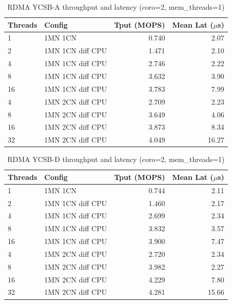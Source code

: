 \documentclass[conference]{IEEEtran}
\begin{document}
\begin{table}[H]
\centering
\caption{RDMA YCSB-A throughput and latency (coro=2, mem\_threads=1)}
\label{tab:rdma-ycsba}
\scriptsize
\begin{tabular}{@{}llrr@{}}
\toprule
\textbf{Threads} & \textbf{Config} & \textbf{Tput (MOPS)} & \textbf{Mean Lat ($\mu$s)} \\
\midrule
1  & 1MN 1CN             & 0.740 & 2.07 \\
2  & 1MN 1CN diff CPU    & 1.471 & 2.10 \\
4  & 1MN 1CN diff CPU    & 2.746 & 2.22 \\
8  & 1MN 1CN diff CPU    & 3.632 & 3.90 \\
16 & 1MN 1CN diff CPU    & 3.783 & 7.99 \\
\midrule
4  & 1MN 2CN diff CPU    & 2.709 & 2.23 \\
8  & 1MN 2CN diff CPU    & 3.649 & 4.06 \\
16 & 1MN 2CN diff CPU    & 3.873 & 8.34 \\
32 & 1MN 2CN diff CPU    & 4.049 & 16.27 \\
\bottomrule
\end{tabular}
\end{table}

\begin{table}[H]
\centering
\caption{RDMA YCSB-D throughput and latency (coro=2, mem\_threads=1)}
\label{tab:rdma-ycsbd}
\scriptsize
\begin{tabular}{@{}llrr@{}}
\toprule
\textbf{Threads} & \textbf{Config} & \textbf{Tput (MOPS)} & \textbf{Mean Lat ($\mu$s)} \\
\midrule
1  & 1MN 1CN             & 0.744 & 2.11 \\
2  & 1MN 1CN diff CPU    & 1.460 & 2.17 \\
4  & 1MN 1CN diff CPU    & 2.699 & 2.34 \\
8  & 1MN 1CN diff CPU    & 3.832 & 3.57 \\
16 & 1MN 1CN diff CPU    & 3.900 & 7.47 \\
\midrule
4  & 1MN 2CN diff CPU    & 2.720 & 2.34 \\
8  & 1MN 2CN diff CPU    & 3.982 & 2.27 \\
16 & 1MN 2CN diff CPU    & 4.229 & 7.80 \\
32 & 1MN 2CN diff CPU    & 4.281 & 15.66 \\
\bottomrule
\end{tabular}
\end{table}
\end{document}
